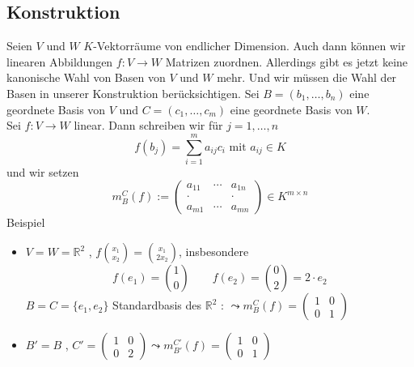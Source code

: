 \subsection{Konstruktion} %
\label{sub:konstruktion}
Seien $V$ und $W$ \(K\)-Vektorräume von endlicher Dimension. Auch dann können wir linearen Abbildungen $f: V \to W$ Matrizen zuordnen. 
Allerdings gibt es jetzt keine kanonische Wahl von Basen von $V$ und $W$ mehr. Und wir müssen die Wahl der Basen in unserer Konstruktion berücksichtigen.
Sei $B=  (b_1, \ldots , b_n)$ eine geordnete Basis von $V$ und $C=(c_1, \ldots , c_m)$ eine geordnete Basis von $W$.
\vspace{10pt} \\
Sei $f: V \to W$ linear. Dann schreiben wir für $j= 1, \ldots , n$
\[
	f(b_j) = \sum\limits_{i=1}^{m} a_{ij} c_i \text{ mit } a_{ij} \in K
\]
und wir setzen
\[
	m_B^C (f) := \begin{pmatrix}
		a_{11} & \cdots & a_{1n} \\
		\cdot & & \cdot \\
		a_{m1} & \cdots & a_{mn}
	\end{pmatrix} \in K^{m \times n}
\]
Beispiel
\begin{itemize}
	\item $V=W=\mathds{R}^2$ , $f \binom{x_1}{x_2} = \binom{x_1}{2 x_2}$, insbesondere
	\[
		f(e_1) = \binom{1}{0} \qquad f(e_2)= \binom{0}{2} = 2 \cdot e_2
	\]
	$B=C=\{ e_1 , e_2 \}$ Standardbasis des $\mathds{R}^2$ : $\leadsto m_B^C (f)= \left( \begin{smallmatrix}
			1 & 0 \\
			0 & 1
		\end{smallmatrix} \right)$
		\item $B'=B$ , $C'= \left( \begin{smallmatrix}
			1 & 0 \\
			0 & 2
		\end{smallmatrix} \right) \leadsto m_{B'}^{C'} (f) =\left( \begin{smallmatrix}
			1 & 0 \\
			0 & 1
		\end{smallmatrix} \right)$
\end{itemize}


